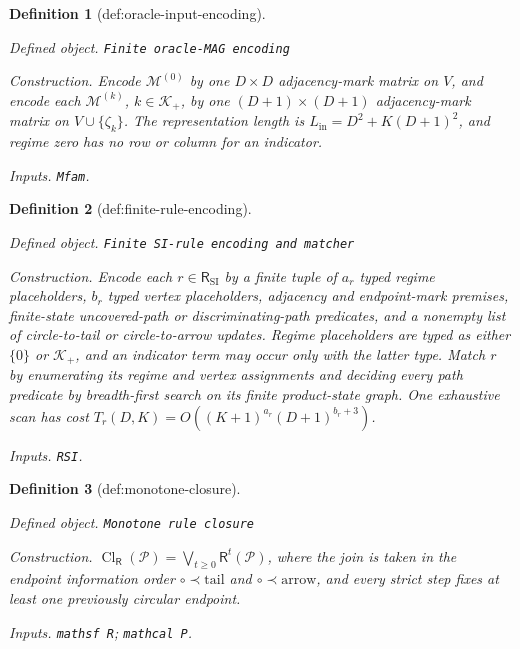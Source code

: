 \documentclass{article}
\newtheorem{definition}{Definition}
\begin{document}
\begin{definition}[def:oracle-input-encoding]\label{def:oracle-input-encoding}
\par\smallskip\noindent\emph{Defined object.} \texttt{Finite oracle-\allowbreak{}MAG encoding}
\par\smallskip\noindent\emph{Construction.} Encode \(\mathcal M^{(0)}\) by one \(D\times D\) adjacency-mark matrix on \(V\), and encode each \(\mathcal M^{(k)}\), \(k\in\mathcal K_+\), by one \((D+1)\times(D+1)\) adjacency-mark matrix on \(V\cup\{\zeta_k\}\). The representation length is \(L_{\mathrm{in}}=D^2+K(D+1)^2\), and regime zero has no row or column for an indicator.
\par\smallskip\noindent\emph{Inputs.} \texttt{Mfam}.
\end{definition}

\begin{definition}[def:finite-rule-encoding]\label{def:finite-rule-encoding}
\par\smallskip\noindent\emph{Defined object.} \texttt{Finite SI-\allowbreak{}rule encoding and matcher}
\par\smallskip\noindent\emph{Construction.} Encode each \(r\in\mathsf R_{\mathrm{SI}}\) by a finite tuple of \(a_r\) typed regime placeholders, \(b_r\) typed vertex placeholders, adjacency and endpoint-mark premises, finite-state uncovered-path or discriminating-path predicates, and a nonempty list of circle-to-tail or circle-to-arrow updates. Regime placeholders are typed as either \(\{0\}\) or \(\mathcal K_+\), and an indicator term may occur only with the latter type. Match \(r\) by enumerating its regime and vertex assignments and deciding every path predicate by breadth-first search on its finite product-state graph. One exhaustive scan has cost \(T_r(D,K)=O((K+1)^{a_r}(D+1)^{b_r+3})\).
\par\smallskip\noindent\emph{Inputs.} \texttt{RSI}.
\end{definition}

\begin{definition}[def:monotone-closure]\label{def:monotone-closure}
\par\smallskip\noindent\emph{Defined object.} \texttt{Monotone rule closure}
\par\smallskip\noindent\emph{Construction.} \(\operatorname{Cl}_{\mathsf R}(\mathcal P)=\bigvee_{t\ge0}\mathsf R^t(\mathcal P)\), where the join is taken in the endpoint information order \(\circ\prec\mathrm{tail}\) and \(\circ\prec\mathrm{arrow}\), and every strict step fixes at least one previously circular endpoint.
\par\smallskip\noindent\emph{Inputs.} \texttt{mathsf R}; \texttt{mathcal P}.
\end{definition}
\end{document}
